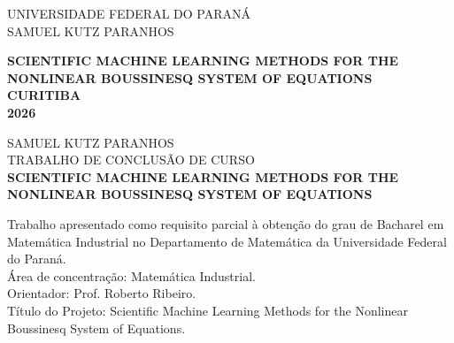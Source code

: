 

\AddToShipoutPicture*{\BackgroundPic}

\clearpage
\thispagestyle{empty}

\begin{bfseries}
\begin{center}

\vspace{0.5cm} 
UNIVERSIDADE FEDERAL DO PARANÁ \\

\vspace{0.6cm}
SAMUEL KUTZ PARANHOS \\
\vspace{2.5cm}

\vspace*{1cm}
\textbf{\MakeUppercase{Scientific Machine Learning Methods for the \\ Nonlinear Boussinesq System of Equations}} \\


\vfill
\textbf{\MakeUppercase{CURITIBA}} \\
\textbf{\MakeUppercase{\textnormal{2026}}}
\end{center}
\end{bfseries}

\ClearShipoutPicture
\pagebreak

\thispagestyle{empty}

\begin{bfseries}
\begin{center}


\vspace{0.6cm}
SAMUEL KUTZ PARANHOS \\
\vspace{2.5cm}
TRABALHO DE CONCLUSÃO DE CURSO \\

\vspace*{1cm}
\textbf{\MakeUppercase{Scientific Machine Learning Methods for the \\ Nonlinear Boussinesq System of Equations}} \\
\end{center}
\end{bfseries}

\vfill
\begin{flushright}
\begin{minipage}{0.8\textwidth}
\raggedleft
\footnotesize
Trabalho apresentado como requisito parcial à obtenção do grau de Bacharel em Matemática Industrial no Departamento de Matemática da Universidade Federal do Paraná.\\[1ex]
Área de concentração: Matemática Industrial.\\[1ex]
Orientador: Prof. Roberto Ribeiro.\\[1ex]
Título do Projeto: Scientific Machine Learning Methods for the Nonlinear Boussinesq System of Equations.
\end{minipage}
\end{flushright}

